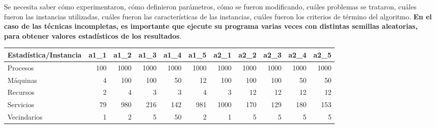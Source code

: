 \documentclass[../informe2.tex]{subfiles}
\begin{document}
Se necesita saber cómo experimentaron, cómo definieron parámetros,
cómo se fueron modificando, cuáles problemas se trataron, cuáles fueron
las instancias utilizadas, cuáles fueron las características de las
instancias, cuáles fueron los criterios de término del algoritmo.
\textbf{En el caso de las técnicas incompletas, es importante que
ejecute su programa varias veces con distintas semillas aleatorias,
para obtener valores estadísticos de los resultados}.

\begin{table}[h]
	\small
	\centering
	\begin{tabular}{@{}lrrrrrrrrrr@{}}
		\toprule
		Estadística/Instancia & \multicolumn{1}{c}{a1\_1} & \multicolumn{1}{c}{a1\_2} & \multicolumn{1}{c}{a1\_3} & \multicolumn{1}{c}{a1\_4} & \multicolumn{1}{c}{a1\_5} & \multicolumn{1}{c}{a2\_1} & \multicolumn{1}{c}{a2\_2} & \multicolumn{1}{c}{a2\_3} & \multicolumn{1}{c}{a2\_4} & \multicolumn{1}{c}{a2\_5} \\ \midrule
		Procesos              & 100                       & 1000                      & 1000                      & 1000                      & 1000                      & 1000                      & 1000                      & 1000                      & 1000                      & 1000                      \\
		Máquinas              & 4                         & 100                       & 100                       & 50                        & 12                        & 100                       & 100                       & 100                       & 50                        & 50                        \\
		Recursos              & 2                         & 4                         & 3                         & 3                         & 4                         & 3                         & 12                        & 12                        & 12                        & 12                        \\
		Servicios             & 79                        & 980                       & 216                       & 142                       & 981                       & 1000                      & 170                       & 129                       & 180                       & 153                       \\
		Vecindarios           & 1                         & 2                         & 5                         & 50                        & 2                         & 1                         & 5                         & 5                         & 5                         & 5                         \\

\end{tabular}
\end{table}
\end{document}
